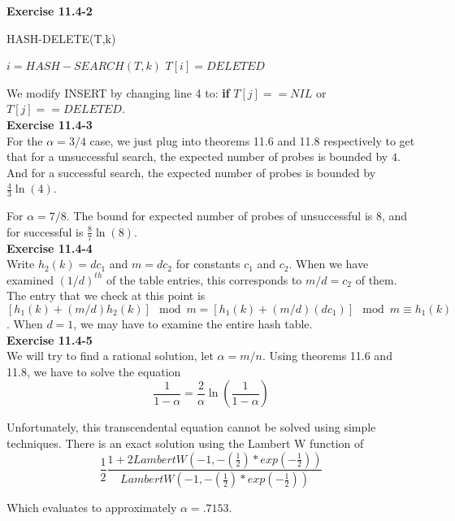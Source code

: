 \documentclass{article}
\begin{document}
\noindent\textbf{Exercise 11.4-2}\\

\begin{algorithm}
\caption{HASH-DELETE(T,k)}
\begin{algorithmic}
\State $i = HASH-SEARCH(T,k)$
\State $T[i] = DELETED$
\end{algorithmic}
\end{algorithm}

We modify INSERT by changing line 4 to: \textbf{if} $T[j] ==NIL$ or $T[j] == DELETED$.\\

\noindent\textbf{ Exercise 11.4-3} \\

For the $\alpha = 3/4$ case, we just plug into theorems 11.6 and 11.8 respectively to get that for a unsuccessful search, the expected number of probes is bounded by $4$. And for a successful search, the expected number of probes is bounded by $\frac{4}{3}\ln(4)$.

For $\alpha = 7/8$. The bound for expected number of probes of unsuccessful is $8$, and for successful is $\frac{8}{7}\ln(8)$.\\

\noindent\textbf{Exercise 11.4-4}\\

Write $h_2(k) = dc_1$ and $m = dc_2$ for constants $c_1$ and $c_2$.  When we have examined $(1/d)^{th}$ of the table entries, this corresponds to $m/d = c_2$ of them. The entry that we check at this point is $[h_1(k) + (m/d)h_2(k)] \mod m =[ h_1(k) + (m/d)(dc_1)] \mod m \equiv h_1(k)$.  When $d=1$, we may have to examine the entire hash table. \\

\noindent\textbf{ Exercise 11.4-5} \\

We will try to find a rational solution, let $\alpha = m/n$. Using theorems 11.6 and 11.8, we have to solve the equation 
\[
\frac{1}{1-\alpha} = \frac{2}{\alpha}\ln(\frac{1}{1-\alpha}) 
\]

Unfortunately, this transcendental equation cannot be solved using simple techniques. There is an exact solution using the Lambert W function of 
\[
\frac{1}{2}\frac{1+2LambertW(-1, -(\frac{1}{2})*exp(-\frac{1}{2}))}{LambertW(-1, -(\frac{1}{2})*exp(-\frac{1}{2})) }
\]

Which evaluates to approximately $\alpha = .7153$.\\
\end{document}

